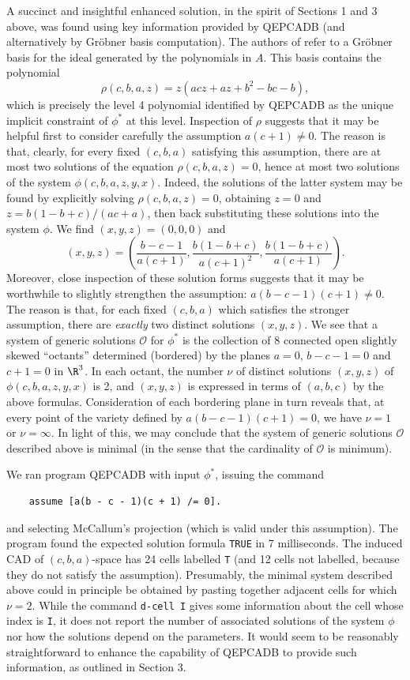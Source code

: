 \documentclass{article}
\begin{document}
A succinct and insightful enhanced solution, in the spirit of
Sections 1 and 3 above, was found using key information provided by
QEPCADB (and alternatively by Gr\"{o}bner basis computation).
The authors of \cite{FGT01} refer to a Gr\"{o}bner basis
for the ideal generated by the polynomials in $A$.
This basis contains the polynomial
\[\rho(c,b,a,z) = z(acz + az + b^2 - bc - b),\]
which is precisely the level 4 polynomial identified by
QEPCADB as the unique implicit constraint of $\phi^*$ at this level.
Inspection of $\rho$ suggests that it may be helpful first to consider
carefully the assumption $a(c+1) \neq 0$.
The reason is that, clearly, for every fixed $(c,b,a)$ satisfying
this assumption, there are at most two solutions of
the equation $\rho(c,b,a,z) = 0$, hence at most two solutions of
the system $\phi(c,b,a,z,y,x)$.
Indeed, the solutions of the latter system may be found
by explicitly solving $\rho(c,b,a,z) = 0$,
obtaining $z = 0$ and $z = b(1-b+c)/(ac+a)$,
then back substituting these solutions into the system $\phi$.
We find $(x,y,z) = (0,0,0)$ and
\[(x,y,z) = \left(\frac{b-c-1}{a(c+1)}, \frac{b(1-b+c)}{a(c+1)^2},
            \frac{b(1-b+c)}{a(c+1)}\right).\]
Moreover, close inspection of these solution forms suggests that it
may be worthwhile to slightly strengthen the assumption:
$a(b-c-1)(c+1) \neq 0$. The reason is that, for each fixed $(c,b,a)$
which satisfies the stronger assumption, there are {\em exactly}
two distinct solutions $(x,y,z)$.
We see that a system of generic solutions $\mathcal{O}$ for $\phi^*$
is the collection
of 8 connected open slightly skewed ``octants'' determined (bordered)
by the planes $a=0$, $b-c-1 = 0$ and $c+1 = 0$ in $\R^3$.
In each octant, the number $\nu$ of distinct solutions $(x,y,z)$
of $\phi(c,b,a,z,y,x)$ is 2,
and $(x,y,z)$ is expressed in terms of $(a,b,c)$ by the above formulas.
Consideration of each bordering plane in turn reveals that,
at every point of the variety defined by $a(b-c-1)(c+1) = 0$,
we have $\nu = 1$ or $\nu = \infty$.
In light of this, we may conclude that the system of generic
solutions $\mathcal{O}$ described above is minimal (in the sense that the
cardinality of $\mathcal{O}$ is minimum).

We ran program QEPCADB with input $\phi^*$, issuing the command
\begin{verbatim}
    assume [a(b - c - 1)(c + 1) /= 0].
\end{verbatim}
and selecting McCallum's projection (which is valid under
this assumption). The program found the expected solution formula
\texttt{TRUE} in 7 milliseconds.
The induced CAD of $(c,b,a)$-space has 24 cells labelled \texttt{T}
(and 12 cells not labelled, because they do not satisfy the assumption).
Presumably, the minimal system described above could in principle
be obtained by pasting together adjacent cells for which $\nu = 2$.
While the command \texttt{d-cell I} gives some information
about the cell whose index is \texttt{I}, it does not report
the number of associated solutions 
of the system $\phi$ nor how the solutions
depend on the parameters. It would seem to be reasonably straightforward
to enhance the capability of QEPCADB to provide such information,
as outlined in Section 3.
\end{document}

